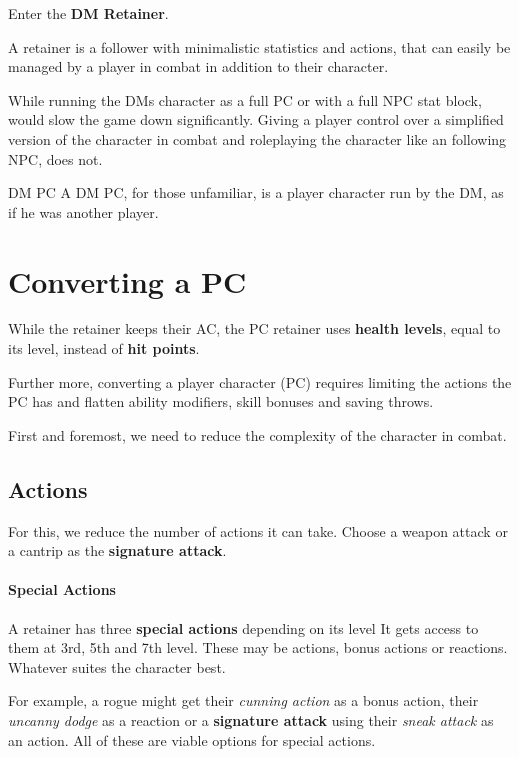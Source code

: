 \documentclass[letterpaper,10pt,twoside,twocolumn,openany]{book}
\begin{document}
Enter the \textbf{DM Retainer}.

A retainer is a follower with minimalistic statistics and actions, that can easily be managed by a player in combat in addition to their character.

While running the DMs character as a full PC or with a full NPC stat block, would slow the game down significantly.
Giving a player control over a simplified version of the character in combat
and roleplaying the character like an following NPC,
does not.

\begin{DndComment}{DM PC}
    A DM PC, for those unfamiliar, is a player character run by the DM, as if he was another player.
\end{DndComment}


\section{Converting a PC}

While the retainer keeps their AC, the PC retainer uses \textbf{health levels}, equal to its level, instead of \textbf{hit points}.%

Further more, converting a player character (PC) requires limiting the actions the PC has and flatten ability modifiers, skill bonuses and saving throws.

First and foremost, we need to reduce the complexity of the character in combat.

\subsection{Actions}
For this, we reduce the number of actions it can take.
Choose a weapon attack or a cantrip as the \textbf{signature attack}.

\paragraph{Special Actions}
A retainer has three \textbf{special actions} depending on its level
It gets access to them at 3rd, 5th and 7th level.
These may be actions, bonus actions or reactions.
Whatever suites the character best.

For example, a rogue might get their \textit{cunning action} as a bonus action, their \textit{uncanny dodge} as a reaction or a \textbf{signature attack} using their \textit{sneak attack} as an action.
All of these are viable options for special actions.
\end{document}
